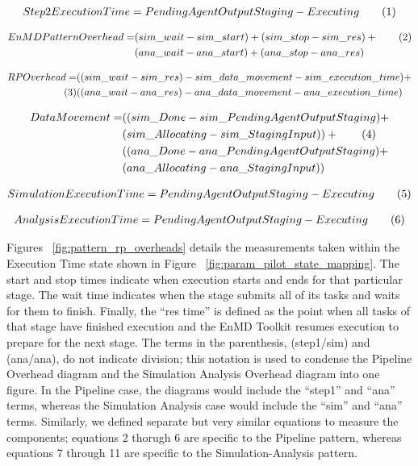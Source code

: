 \documentclass[]{article}
\newcommand\numberthis{\addtocounter{equation}{1}\tag{\theequation}}
\begin{document}
			\begin{align*}
				Step 2 Execution Time = PendingAgentOutputStaging - Executing \numberthis \label{6}
			\end{align*}

			\begin{align*}
				EnMD Pattern Overhead = &(sim\_wait-sim\_start) + (sim\_stop - sim\_res) + \numberthis \label{7} \\
										&(ana\_wait-ana\_start) + (ana\_stop - ana\_res) 
			\end{align*}

			\begin{align*}
				RP Overhead = &((sim\_wait - sim\_res) - sim\_data\_movement - sim\_execution\_time) + \\ \numberthis \label{8} 
							  &((ana\_wait - ana\_res) - ana\_data\_movement - ana\_execution\_time) 
			\end{align*}

			\begin{align*}
				Data Movement = &((sim\_Done - sim\_PendingAgentOutputStaging) + \\
								&(sim\_Allocating - sim\_StagingInput)) + \numberthis \label{9} \\
								&((ana\_Done - ana\_PendingAgentOutputStaging) + \\
								&(ana\_Allocating - ana\_StagingInput)) 
			\end{align*}
			
			\begin{align*}
				Simulation Execution Time = PendingAgentOutputStaging - Executing \numberthis \label{10}
			\end{align*}

			\begin{align*}
				Analysis Execution Time = PendingAgentOutputStaging - Executing \numberthis \label{11}
			\end{align*}



			Figures ~\ref{fig:pattern_rp_overheads} details the measurements taken within the Execution Time state shown in Figure ~\ref{fig:param_pilot_state_mapping}. The start and stop times indicate when execution starts and ends for that particular stage. The wait time indicates when the stage submits all of its tasks and waits for them to finish. Finally, the ``res time'' is defined as the point when all tasks of that stage have finished execution and the EnMD Toolkit resumes execution to prepare for the next stage. The terms in the parenthesis, (step1/sim) and (ana/ana), do not indicate division; this notation is used to condense the Pipeline Overhead diagram and the Simulation Analysis Overhead diagram into one figure. In the Pipeline case, the diagrams would include the ``step1'' and ``ana'' terms, whereas the Simulation Analysis case would include the ``sim'' and ``ana'' terms. Similarly, we defined separate but very similar equations to measure the components; equations 2 thorugh 6 are specific to the Pipeline pattern, whereas equations 7 through 11 are specific to the Simulation-Analysis pattern.
\end{document}
